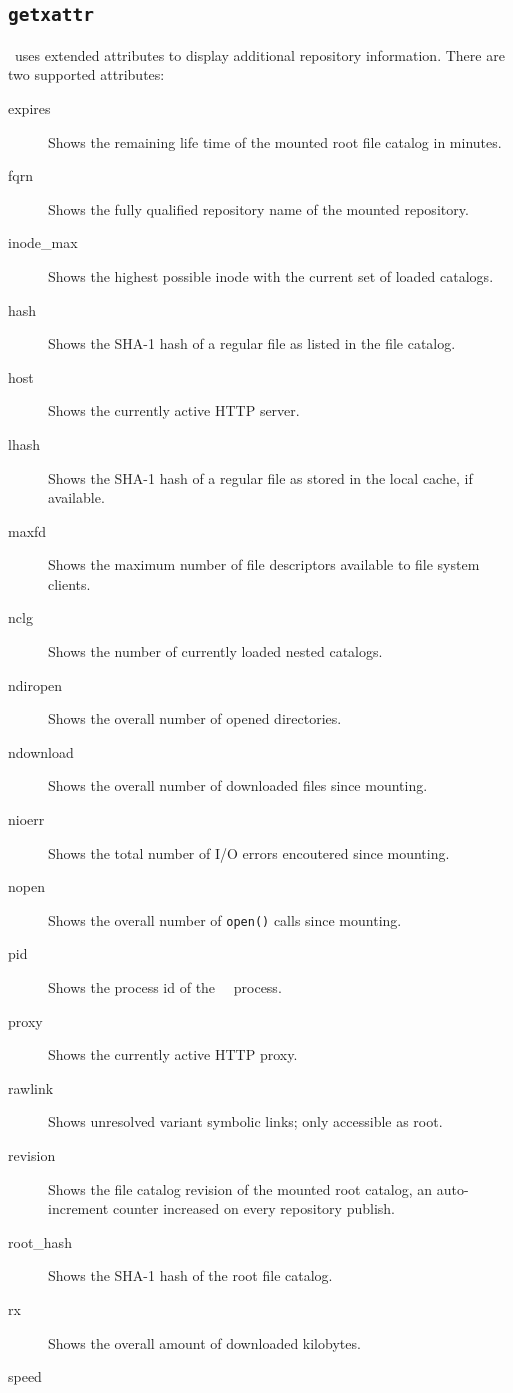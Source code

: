 \subsection{\tt getxattr}
\cvmfs\ uses extended attributes to display additional repository information.
There are two supported attributes:
\begin{description}
	\item[expires]
		Shows the remaining life time of the mounted root file catalog in minutes.
	\item[fqrn]
		Shows the fully qualified repository name of the mounted repository.
	\item[inode\_max]
		Shows the highest possible inode with the current set of loaded catalogs.		
	\item[hash]
		Shows the SHA-1 hash of a regular file as listed in the file catalog.
	\item[host]
		Shows the currently active HTTP server.
	\item[lhash]
		Shows the SHA-1 hash of a regular file as stored in the local cache, if available.
	\item[maxfd]
		Shows the maximum number of file descriptors available to file system clients.
	\item[nclg]
		Shows the number of currently loaded nested catalogs.
	\item[ndiropen]
		Shows the overall number of opened directories.
	\item[ndownload]
		Shows the overall number of downloaded files since mounting.
	\item[nioerr]
		Shows the total number of I/O errors encoutered since mounting.			
	\item[nopen]
		Shows the overall number of \texttt{open()} calls since mounting.
	\item[pid]
		Shows the process id of the \cvmfs\ \fuse\ process.		
	\item[proxy]
		Shows the currently active HTTP proxy.
	\item[rawlink]
	    Shows unresolved variant symbolic links; only accessible as root.
	\item[revision]
		Shows the file catalog revision of the mounted root catalog, an auto-increment counter increased on every repository publish.
	\item[root\_hash]
		Shows the SHA-1 hash of the root file catalog.
	\item[rx]
		Shows the overall amount of downloaded kilobytes.
	\item[speed]

\end{description}
